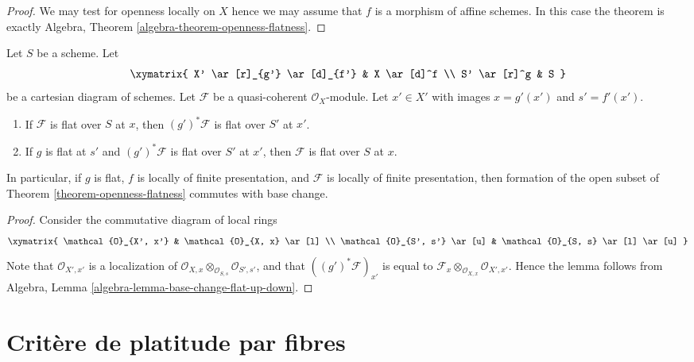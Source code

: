 \begin{proof}
We may test for openness locally on $X$ hence we may assume
that $f$ is a morphism of affine schemes. In this case the
theorem is exactly
Algebra, Theorem \ref{algebra-theorem-openness-flatness}.
\end{proof}

\begin{lemma}
\label{lemma-flat-locus-base-change}
Let $S$ be a scheme.
Let
$$
\xymatrix{
X' \ar[r]_{g'} \ar[d]_{f'} & X \ar[d]^f \\
S' \ar[r]^g & S
}
$$
be a cartesian diagram of schemes.
Let $\mathcal{F}$ be a quasi-coherent $\mathcal{O}_X$-module.
Let $x' \in X'$ with images
$x = g'(x')$ and $s' = f'(x')$.
\begin{enumerate}
\item If $\mathcal{F}$ is flat over $S$ at $x$, then
$(g')^*\mathcal{F}$ is flat over $S'$ at $x'$.
\item If $g$ is flat at $s'$ and $(g')^*\mathcal{F}$ is flat over $S'$ at
$x'$, then $\mathcal{F}$ is flat over $S$ at $x$.
\end{enumerate}
In particular, if $g$ is flat, $f$ is locally of finite presentation,
and $\mathcal{F}$ is locally of finite presentation,
then formation of the open subset of
Theorem \ref{theorem-openness-flatness}
commutes with base change.
\end{lemma}

\begin{proof}
Consider the commutative diagram of local rings
$$
\xymatrix{
\mathcal{O}_{X', x'} & \mathcal{O}_{X, x} \ar[l] \\
\mathcal{O}_{S', s'} \ar[u] & \mathcal{O}_{S, s} \ar[l] \ar[u]
}
$$
Note that $\mathcal{O}_{X', x'}$
is a localization of
$\mathcal{O}_{X, x} \otimes_{\mathcal{O}_{S, s}} \mathcal{O}_{S', s'}$,
and that $((g')^*\mathcal{F})_{x'}$ is equal to
$\mathcal{F}_x \otimes_{\mathcal{O}_{X, x}} \mathcal{O}_{X', x'}$.
Hence the lemma follows from
Algebra, Lemma \ref{algebra-lemma-base-change-flat-up-down}.
\end{proof}






\section{Crit\`ere de platitude par fibres}
\label{section-criterion-flat-fibres}

